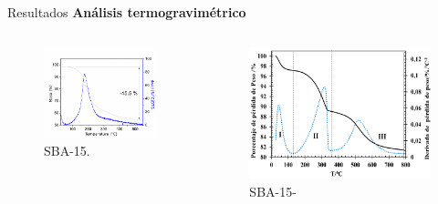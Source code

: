 \documentclass[handout]{beamer}
\begin{document}
\begin{frame}{Resultados}
	\textbf{An\'alisis termogravim\'etrico}
	\begin{columns}
		\begin{column}{0.5\textwidth}
			\begin{figure}
				\centering
				\includegraphics[width=\linewidth]{../structures/TGA-calcination.pdf}
				\caption{SBA-15.}
			\end{figure}
		\end{column}
		\begin{column}{0.5\textwidth}
			\begin{figure}
				\centering
				\includegraphics[width=\linewidth]{../structures/TGA-NH2.png}
				\caption{SBA-15-}
			\end{figure}
		\end{column}
	\end{columns}
\end{frame}
\end{document}
